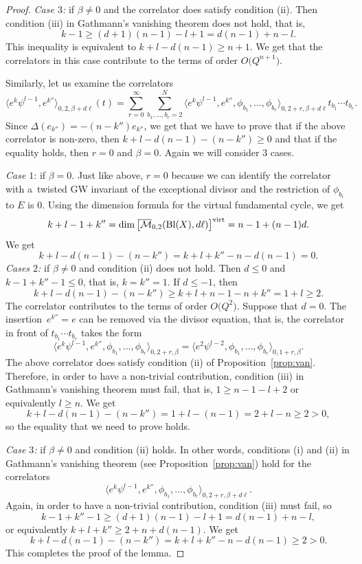 \documentclass[pdftex]{sigma}
\numberwithin{equation}{section}
\begin{document}
\begin{proof}
{\em Case $3$:} if $\beta\neq 0$ and the correlator does satisfy
condition (ii). Then condition (iii) in Gathmann's
vanishing theorem does not hold, that is,
\[
k-1 \geq (d+1)(n-1) - l+1 = d(n-1) + n-l.
\]
This inequality is equivalent to $k+l-d(n-1)\geq n+1$. We get that the
correlators in this case contribute to the terms of order
$O\big(Q^{n+1}\big)$.

Similarly, let us examine the correlators
\[
\big\langle e^k \psi^{l-1}, e^{k''}\big\rangle_{0,2,\beta+d\ell}(t) =
\sum_{r=0}^\infty
\sum_{b_1,\dots,b_r=2}^N
\big\langle e^k \psi^{l-1}, e^{k''},\phi_{b_1},\dots,\phi_{b_r}
\big\rangle_{0,2+r,\beta+d\ell}
t_{b_1}\cdots t_{b_r}.
\]
Since $\Delta(e_{k''}) = -(n-k'') e_{k''}$, we get that we have to
prove that if the above correlator is non-zero, then
$k+l-d(n-1) -(n-k'')\geq 0$ and that if the equality holds, then $r=0$
and $\beta=0$. Again we will consider 3 cases.

{\em Case $1$}: if $\beta=0$. Just like above,
$r=0$ because we can identify the correlator with a~twisted GW
invariant of the exceptional divisor and the restriction of
$\phi_{b_i}$ to $E$ is 0. Using the dimension formula for the virtual
fundamental cycle, we get
\[
k+l-1+k'' = \operatorname{dim}\big[
\overline{\mathcal{M}}_{0,2}(\operatorname{Bl}(X),d\ell)\big]^{\textnormal{virt}}
=
n-1+(n-1) d.
\]
We get
\[
k+l-d(n-1) -(n-k'') = k+l+k''-n-d(n-1) = 0.
\]
{\em Cases $2$:} if $\beta\neq 0$ and condition (ii) does not hold. Then
$d\leq 0$ and $k-1+k''-1\leq 0$, that is, $k=k''=1$. If
$d\leq -1$, then
\[
k+l-d(n-1)-(n-k'')\geq k+l +n-1-n+k'' = 1+l\geq 2.
\]
The correlator contributes to the terms of order $O\big(Q^2\big)$. Suppose
that $d=0$. The insertion~${e^{k''}=e}$ can be removed via the divisor
equation, that is, the correlator in front of $t_{b_1}\cdots t_{b_r}$
takes the form
\[
\big\langle e^k \psi^{l-1}, e^{k''},\phi_{b_1},\dots,\phi_{b_r}
\big\rangle_{0,2+r,\beta} =
\big\langle e^2 \psi^{l-2},\phi_{b_1},\dots,\phi_{b_r}
\big\rangle_{0,1+r,\beta}.
\]
The above correlator does satisfy condition (ii) of Proposition~\ref{prop:van}. Therefore, in order to have a non-trivial
contribution, condition (iii) in Gathmann's vanishing theorem must
fail, that is, $1\geq n-1 -l+2$ or equivalently $l\geq n$. We get
\[
k+l-d(n-1) -(n-k'') = 1+l-(n-1) = 2+l-n\geq 2 >0,
\]
so the equality that we need to prove holds.

{\em Case $3$:} if $\beta\neq 0$ and condition (ii) holds. In other words,
conditions (i) and (ii) in Gathmann's vanishing theorem (see
Proposition~\ref{prop:van}) hold for the correlators
\[
\big\langle e^k \psi^{l-1}, e^{k''},\phi_{b_1},\dots,\phi_{b_r}
\big\rangle_{0,2+r,\beta+d\ell}.
\]
Again, in order to have a non-trivial contribution, condition (iii) must fail, so
\[
k-1 + k''-1 \geq (d+1)(n-1)-l+1=d(n-1) +n -l,
\]
or equivalently $k+l+k'' \geq 2+ n + d(n-1)$. We get
\[
k+l-d(n-1) -(n-k'') = k+l+k''-n -d (n-1)\geq 2 >0.
\]
This completes the proof of the lemma.
\end{proof}
\end{document}
